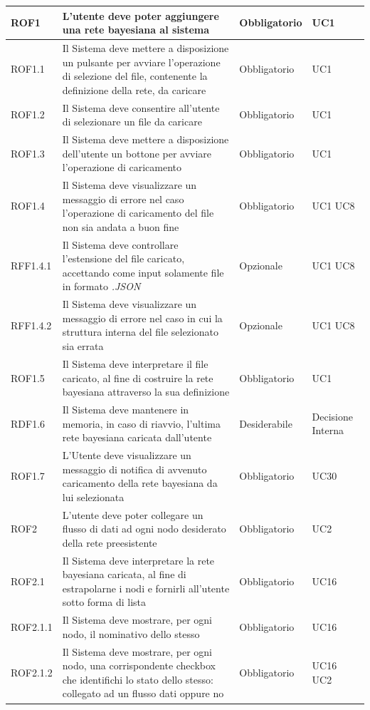 \begin{center}
\begin{longtable}[c]{|m{}|m{}|m{}|m{}|}
ROF1 & L'utente deve poter aggiungere una rete bayesiana al sistema & Obbligatorio & UC1\\
\hline
\rowcolor{grigio}ROF1.1 & Il Sistema deve mettere a disposizione un pulsante per avviare l'operazione di selezione del file, contenente la definizione della rete, da caricare & Obbligatorio & UC1\\
\hline
ROF1.2 & Il Sistema deve consentire all'utente di selezionare un file da caricare & Obbligatorio & UC1\\
\hline
\rowcolor{grigio}ROF1.3 & Il Sistema deve mettere a disposizione dell'utente un bottone per avviare l'operazione di caricamento & Obbligatorio & UC1\\
\hline
ROF1.4 & Il Sistema deve visualizzare un messaggio di errore nel caso l'operazione di caricamento del file non sia andata a buon fine & Obbligatorio & UC1 UC8\\
\hline
\rowcolor{grigio}RFF1.4.1 & Il Sistema deve controllare l'estensione del file caricato, accettando come input solamente file in formato \textit{.JSON} & Opzionale & UC1 UC8\\
\hline
RFF1.4.2 & Il Sistema deve visualizzare un messaggio di errore nel caso in cui la struttura interna del file selezionato sia errata & Opzionale & UC1 UC8\\
\hline
\rowcolor{grigio}ROF1.5 & Il Sistema deve interpretare il file caricato, al fine di costruire la rete bayesiana attraverso la sua definizione & Obbligatorio & UC1\\
\hline
RDF1.6 & Il Sistema deve mantenere in memoria, in caso di riavvio, l'ultima rete bayesiana caricata dall'utente & Desiderabile & Decisione Interna\\
\hline
\rowcolor{grigio}ROF1.7 & L'Utente deve visualizzare un messaggio di notifica di avvenuto caricamento della rete bayesiana da lui selezionata & Obbligatorio & UC30\\
\hline
ROF2 & L'utente deve poter collegare un flusso di dati ad ogni nodo desiderato della rete preesistente & Obbligatorio & UC2\\
\hline
\rowcolor{grigio}ROF2.1 & Il Sistema deve interpretare la rete bayesiana caricata, al fine di estrapolarne i nodi e fornirli all'utente sotto forma di lista & Obbligatorio & UC16\\
\hline
ROF2.1.1 & Il Sistema deve mostrare, per ogni nodo, il nominativo dello stesso & Obbligatorio & UC16\\
\hline
\rowcolor{grigio}ROF2.1.2 & Il Sistema deve mostrare, per ogni nodo, una corrispondente checkbox che identifichi lo stato dello stesso: collegato ad un flusso dati oppure no & Obbligatorio & UC16 UC2\\

\end{longtable}
\end{center}
